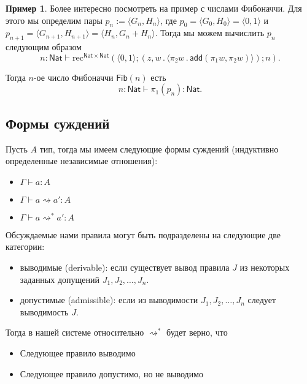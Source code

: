\documentclass[openany]{book}
\theoremstyle{plain}
\theoremstyle{definition}
\newtheorem{eg}{Пример}[]
\newcommand{\rec}{\mathrm{rec}}
\newcommand{\nat}{\mathsf{Nat}}
\begin{document}
\begin{eg}
    Более интересно посмотреть на пример с числами Фибоначчи. Для этого мы определим пары \(p_n := \langle G_n, H_n \rangle\), где \(p_0 = \langle G_0, H_0 \rangle = \langle 0, 1 \rangle\) и \(p_{n+1} = \langle G_{n+1}, H_{n+1} \rangle = \langle H_n, G_n + H_n \rangle\). Тогда мы можем вычислить \(p_n\) следующим образом \[n : \nat \vdash \rec^{\nat \times \nat} (\langle 0, 1 \rangle; (z, w\,.\, \langle \pi_2 w\,.\, \mathsf{add}(\pi_1 w, \pi_2 w)\rangle); n).\]

    Тогда \(n\)-ое число Фибоначчи \(\mathsf{Fib}(n)\) есть \[n : \nat \vdash \pi_1(p_n) : \nat.\]
\end{eg}

\subsection{Формы суждений}

Пусть \(A\) тип, тогда мы имеем следующие формы суждений (индуктивно определенные независимые отношения):
\begin{itemize}
    \item \(\Gamma \vdash a:A\)
    \item \(\Gamma \vdash a \rightsquigarrow a':A\)
    \item \(\Gamma \vdash a \rightsquigarrow^* a':A\)
\end{itemize}

Обсуждаемые нами правила могут быть подразделены на следующие две категории:

\begin{itemize}
    \item выводимые (derivable): если существует вывод правила \(J\) из некоторых заданных допущений \(J_1, J_2, \dots, J_n\).
    \item допустимые (admissible): если из выводимости \(J_1, J_2, \dots, J_n\) следует выводимость \(J\).
\end{itemize}

Тогда в нашей системе относительно \(\rightsquigarrow^*\) будет верно, что
\begin{itemize}
    \item Следующее правило выводимо
        \begin{prooftree}
        \end{prooftree}

    \item Следующее правило допустимо, но не выводимо
        \begin{prooftree}
        \end{prooftree}
\end{itemize}
\end{document}
